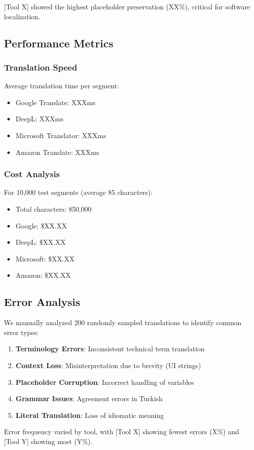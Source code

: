 [Tool X] showed the highest placeholder preservation (XX\%), critical for software localization.

\subsection{Performance Metrics}

\subsubsection{Translation Speed}

Average translation time per segment:
\begin{itemize}
    \item Google Translate: XXXms
    \item DeepL: XXXms
    \item Microsoft Translator: XXXms
    \item Amazon Translate: XXXms
\end{itemize}

\subsubsection{Cost Analysis}

For 10,000 test segments (average 85 characters):
\begin{itemize}
    \item Total characters: 850,000
    \item Google: \$XX.XX
    \item DeepL: \$XX.XX
    \item Microsoft: \$XX.XX
    \item Amazon: \$XX.XX
\end{itemize}

\subsection{Error Analysis}

We manually analyzed 200 randomly sampled translations to identify common error types:

\begin{enumerate}
    \item \textbf{Terminology Errors}: Inconsistent technical term translation
    \item \textbf{Context Loss}: Misinterpretation due to brevity (UI strings)
    \item \textbf{Placeholder Corruption}: Incorrect handling of variables
    \item \textbf{Grammar Issues}: Agreement errors in Turkish
    \item \textbf{Literal Translation}: Loss of idiomatic meaning
\end{enumerate}

Error frequency varied by tool, with [Tool X] showing fewest errors (X\%) and [Tool Y] showing most (Y\%).
